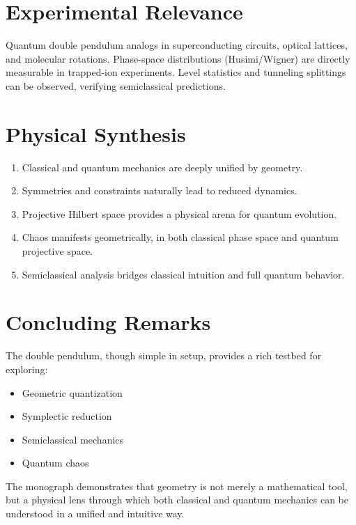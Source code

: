 \documentclass[11pt]{book}
\begin{document}
\section{Experimental Relevance}

 Quantum double pendulum analogs in superconducting circuits, optical lattices, and molecular rotations.  
 Phase-space distributions (Husimi/Wigner) are directly measurable in trapped-ion experiments.  
 Level statistics and tunneling splittings can be observed, verifying semiclassical predictions.

\section{Physical Synthesis}
\begin{enumerate}
   \item
 Classical and quantum mechanics are deeply unified by geometry.  
   \item
 Symmetries and constraints naturally lead to reduced dynamics.  
   \item
 Projective Hilbert space provides a physical arena for quantum evolution.  
   \item
 Chaos manifests geometrically, in both classical phase space and quantum projective space.  
   \item
 Semiclassical analysis bridges classical intuition and full quantum behavior.
\end{enumerate}

\section{Concluding Remarks}

The double pendulum, though simple in setup, provides a rich testbed for exploring:
\begin{itemize}
   \item
 Geometric quantization  
   \item
 Symplectic reduction  
   \item
 Semiclassical mechanics  
   \item
 Quantum chaos  
\end{itemize}

The monograph demonstrates that geometry is not merely a mathematical tool, 
but a physical lens through which both classical and quantum mechanics can be 
understood in a unified and intuitive way.
\end{document}

